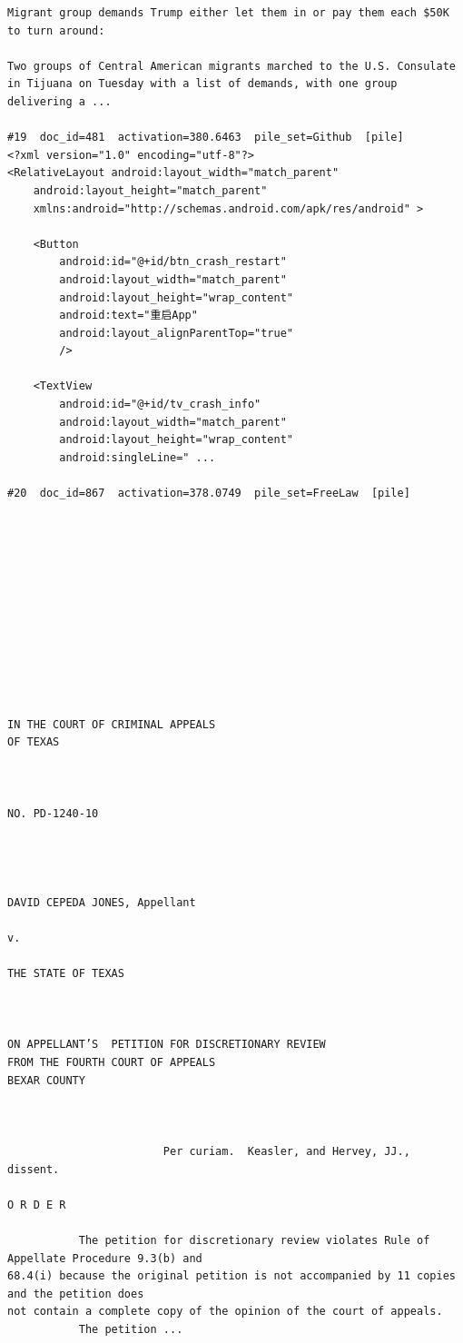 \begin{verbatim}
Migrant group demands Trump either let them in or pay them each $50K to turn around:

Two groups of Central American migrants marched to the U.S. Consulate in Tijuana on Tuesday with a list of demands, with one group delivering a ...

#19  doc_id=481  activation=380.6463  pile_set=Github  [pile]
<?xml version="1.0" encoding="utf-8"?>
<RelativeLayout android:layout_width="match_parent"
    android:layout_height="match_parent"
    xmlns:android="http://schemas.android.com/apk/res/android" >

    <Button
        android:id="@+id/btn_crash_restart"
        android:layout_width="match_parent"
        android:layout_height="wrap_content"
        android:text="重启App"
        android:layout_alignParentTop="true"
        />

    <TextView
        android:id="@+id/tv_crash_info"
        android:layout_width="match_parent"
        android:layout_height="wrap_content"
        android:singleLine=" ...

#20  doc_id=867  activation=378.0749  pile_set=FreeLaw  [pile]












IN THE COURT OF CRIMINAL APPEALS
OF TEXAS



NO. PD-1240-10




DAVID CEPEDA JONES, Appellant

v.

THE STATE OF TEXAS



ON APPELLANT’S  PETITION FOR DISCRETIONARY REVIEW
FROM THE FOURTH COURT OF APPEALS
BEXAR COUNTY



                        Per curiam.  Keasler, and Hervey, JJ., dissent.

O R D E R 

           The petition for discretionary review violates Rule of Appellate Procedure 9.3(b) and
68.4(i) because the original petition is not accompanied by 11 copies and the petition does
not contain a complete copy of the opinion of the court of appeals.
           The petition ...

\end{verbatim}

